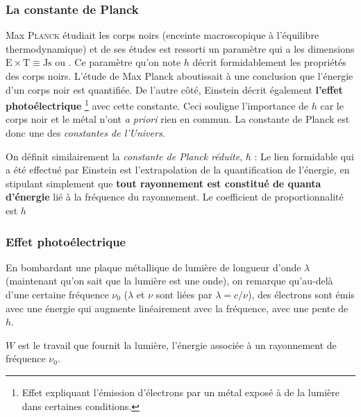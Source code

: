 \documentclass[11pt]{book}
\begin{document}
\subsubsection{La constante de Planck}
Max \textsc{Planck} étudiait les corps noirs (enceinte macroscopique à l'équilibre thermodynamique) et de ses études est ressorti un paramètre qui a les dimensions $\mathrm{E} \times \mathrm{T} \equiv \mathrm{Js}$ ou . Ce paramètre qu'on note $h$ décrit formidablement les propriétés des corps noirs. L'étude de Max Planck aboutissait à une conclusion que l'énergie d'un corps noir est quantifiée. De l'autre côté, Einstein décrit également \textbf{l'effet photoélectrique} \footnote{Effet expliquant l'émission d'électrons par un métal exposé à de la lumière dans certaines conditions.} avec cette constante. Ceci souligne l'importance de $h$ car le corps noir et le métal n'ont \textit{a priori} rien en commun. La constante de Planck est donc une des \textit{constantes de l'Univers}.

On définit similairement la \textit{constante de Planck réduite}, $\hbar$ :
 Le lien formidable qui a été effectué par Einstein est l'extrapolation de la quantification de l'énergie, en stipulant simplement que \textbf{tout rayonnement est constitué de quanta d'énergie} lié à la fréquence du rayonnement. Le coefficient de proportionnalité est $h$
\subsubsection{Effet photoélectrique}
En bombardant une plaque métallique de lumière de longueur d'onde $\lambda$ (maintenant qu'on sait que la lumière est une onde), on remarque qu'au-delà d'une certaine fréquence $\nu_0$ ($\lambda$ et $\nu$ sont liées par $\lambda = c/\nu$), des électrons sont émis avec une énergie qui augmente linéairement avec la fréquence, avec une pente de $h$.

$W$ est le travail que fournit la lumière, l'énergie associée à un rayonnement de fréquence $\nu_0$.
\end{document}
